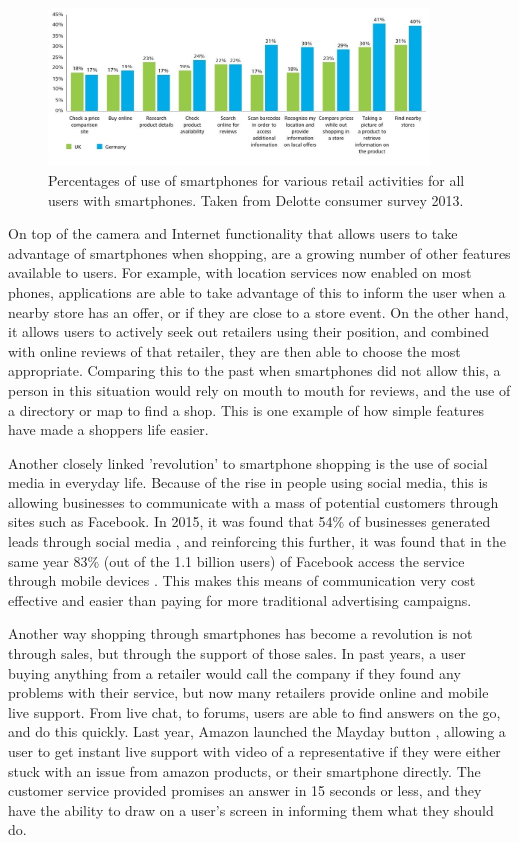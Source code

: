   \begin{figure}[H]
  \caption{Percentages of use of smartphones for various retail activities for all users with smartphones. Taken from Delotte consumer survey 2013.}
  \centering
  \label{fig:delotte}
    \includegraphics[width=0.9\textwidth]{usage}
\end{figure}
On top of the camera and Internet functionality that allows users to take advantage of smartphones when shopping, are a growing number of other features available to users. For example, with location services now enabled on most phones, applications are able to take advantage of this to inform the user when a nearby store has an offer, or if they are close to a store event. On the other hand, it allows users to actively seek out retailers using their position, and combined with online reviews of that retailer, they are then able to choose the most appropriate. Comparing this to the past when smartphones did not allow this, a person in this situation would rely on mouth to mouth for reviews, and the use of a directory or map to find a shop. This is one example of how simple features have made a shoppers life easier. \par

Another closely linked 'revolution' to smartphone shopping is the use of social media in everyday life. Because of the rise in people using social media, this is allowing businesses to communicate with a mass of potential customers through sites such as Facebook. In 2015, it was found that 54\% of businesses generated leads through social media \cite{business}, and reinforcing this further, it was found that in the same year 83\% (out of the 1.1 billion users) of Facebook access the service through mobile devices \cite{facebook}. This makes this means of communication very cost effective and easier than paying for more traditional advertising campaigns. \par

Another way shopping through smartphones has become a revolution is not through sales, but through the support of those sales. In past years, a user buying anything from a retailer would call the company if they found any problems with their service, but now many retailers provide online and mobile live support. From live chat, to forums, users are able to find answers on the go, and do this quickly. Last year, Amazon launched the Mayday button \cite{mayday}, allowing a user to get instant live support with video of a representative if they were either stuck with an issue from amazon products, or their smartphone directly. The customer service provided promises an answer in 15 seconds or less, and they have the ability to draw on a user's screen in informing them what they should do.

